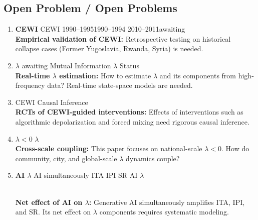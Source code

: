 \documentclass[11pt,a4paper]{article}
\theoremstyle{remark}
\newcommand{\lambdaparam}{\lambda}
\begin{document}
\subsection{Open Problem / Open Problems}

\begin{enumerate}
    \item \textbf{CEWI }  CEWI 
          1990--19951990--1994
          2010--2011awaiting
          \\[2pt]
          \textbf{Empirical validation of CEWI:} Retrospective testing on historical
          collapse cases (Former Yugoslavia, Rwanda, Syria) is needed.

    \item \textbf{$\lambdaparam$ } awaiting
          Mutual Information $\lambdaparam$ \textbf{}
          Status
          \\[2pt]
          \textbf{Real-time $\lambdaparam$ estimation:} How to estimate $\lambdaparam$
          and its components from high-frequency data? Real-time state-space models
          are needed.

    \item \textbf{} CEWI 
          Causal Inference
          \\[2pt]
          \textbf{RCTs of CEWI-guided interventions:} Effects of interventions such
          as algorithmic depolarization and forced mixing need rigorous causal inference.

    \item \textbf{}  $\lambdaparam < 0$
           $\lambdaparam$ 
          \\[2pt]
          \textbf{Cross-scale coupling:} This paper focuses on national-scale
          $\lambdaparam < 0$. How do community, city, and global-scale $\lambdaparam$
          dynamics couple?

    \item \textbf{AI  $\lambdaparam$ }  AI simultaneously ITA
          IPI SR
          AI  $\lambdaparam$ 
          
          \\[2pt]
          \textbf{Net effect of AI on $\lambdaparam$:} Generative AI simultaneously
          amplifies ITA, IPI, and SR. Its net effect on $\lambdaparam$ components
          requires systematic modeling.
\end{enumerate}

\newpage
\appendix
\end{document}
